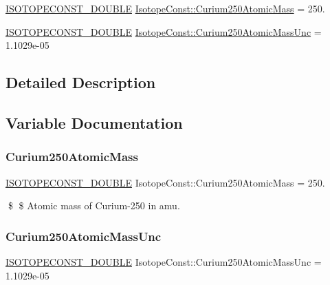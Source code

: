 \begin{DoxyCompactItemize}
\item 
\mbox{\hyperlink{group___isotope_const-_macros_ga8f45a7272ce02c0b4c65c44636ed719a}{I\+S\+O\+T\+O\+P\+E\+C\+O\+N\+S\+T\+\_\+\+D\+O\+U\+B\+LE}} \mbox{\hyperlink{group___isotope_const-_curium-_cm250_ga113a41d2991574fe429fa1977555270c}{Isotope\+Const\+::\+Curium250\+Atomic\+Mass}} = 250.
\item 
\mbox{\hyperlink{group___isotope_const-_macros_ga8f45a7272ce02c0b4c65c44636ed719a}{I\+S\+O\+T\+O\+P\+E\+C\+O\+N\+S\+T\+\_\+\+D\+O\+U\+B\+LE}} \mbox{\hyperlink{group___isotope_const-_curium-_cm250_ga7f6708dc1213065906eda48377dd0765}{Isotope\+Const\+::\+Curium250\+Atomic\+Mass\+Unc}} = 1.\+1029e-\/05
\end{DoxyCompactItemize}


\subsection{Detailed Description}


\subsection{Variable Documentation}
\mbox{\label{group___isotope_const-_curium-_cm250_ga113a41d2991574fe429fa1977555270c}} 
\subsubsection{\texorpdfstring{Curium250\+Atomic\+Mass}{Curium250AtomicMass}}
{\footnotesize\ttfamily \mbox{\hyperlink{group___isotope_const-_macros_ga8f45a7272ce02c0b4c65c44636ed719a}{I\+S\+O\+T\+O\+P\+E\+C\+O\+N\+S\+T\+\_\+\+D\+O\+U\+B\+LE}} Isotope\+Const\+::\+Curium250\+Atomic\+Mass = 250.}

\$ \$ Atomic mass of Curium-\/250 in amu. \mbox{\label{group___isotope_const-_curium-_cm250_ga7f6708dc1213065906eda48377dd0765}} 
\subsubsection{\texorpdfstring{Curium250\+Atomic\+Mass\+Unc}{Curium250AtomicMassUnc}}
{\footnotesize\ttfamily \mbox{\hyperlink{group___isotope_const-_macros_ga8f45a7272ce02c0b4c65c44636ed719a}{I\+S\+O\+T\+O\+P\+E\+C\+O\+N\+S\+T\+\_\+\+D\+O\+U\+B\+LE}} Isotope\+Const\+::\+Curium250\+Atomic\+Mass\+Unc = 1.\+1029e-\/05}

